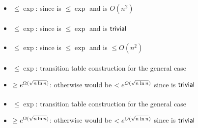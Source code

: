 \paragraph{\OMOLA{}\tto\TDFA}
\begin{itemize}
	\item $\le\exp$: since \hyperref[cost:OM1LAto1NFAu]{\OMOLA{}\tto\ONFA} is $\le\exp$ and \ONFA{}\tto\TDFA is $O(n^2)$
\end{itemize}
\paragraph{\OMOLA{}\tto\TNFA}
\begin{itemize}
	\item $\le\exp$: since \hyperref[cost:OM1LAto1NFAu]{\OMOLA{}\tto\ONFA} is $\le\exp$ and \ONFA{}\tto\TNFA is $\mathsf{trivial}$
\end{itemize}
\paragraph{\OMOLA{}\tto\OMODLA}
\begin{itemize}
	\item $\le\exp$: since \hyperref[cost:OM1LAto1NFAu]{\OMOLA{}\tto\ONFA} is $\le\exp$ and \hyperref[cost:1NFAtoOM1DLAu]{\ONFA{}\tto\OMODLA} is $\le O(n^2)$
\end{itemize}
\paragraph{\OMODLA{}\tto\ODFA}
\begin{itemize}
	\item $\le\exp$: transition table construction for the general case \cite{PigPis14}
	\item $\ge e^{\Omega(\sqrt{n\ln n})}$: otherwise \hyperref[cost:2DFAto1DFAu]{\TDFA{}\tto\ODFA} would be $<e^{O(\sqrt{n\ln n})}$ since \TDFA{}\tto\OMODLA is $\mathsf{trivial}$
\end{itemize}
\paragraph{\OMODLA{}\tto\ONFA}
\begin{itemize}
	\item $\le\exp$: transition table construction for the general case \cite{PigPis14}
	\item $\ge e^{\Omega(\sqrt{n\ln n})}$: otherwise \hyperref[cost:2DFAto1NFAu]{\TDFA{}\tto\ONFA} would be $<e^{O(\sqrt{n\ln n})}$ since \TDFA{}\tto\OMODLA is $\mathsf{trivial}$
\end{itemize}
